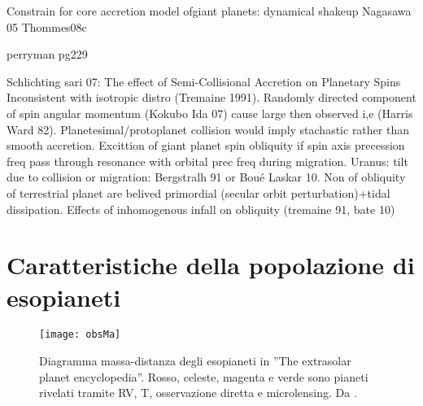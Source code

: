 \begin{workout}

\end{workout}

\begin{workout}
Constrain for core accretion model ofgiant planets: dynamical shakeup Nagasawa 05 Thommes08c
\end{workout}

\begin{workout}
perryman pg229
\end{workout}


\begin{workout}

\end{workout}

\begin{workout}
Schlichting sari 07: The effect of Semi-Collisional Accretion on Planetary Spins
Inconsistent with isotropic distro (Tremaine 1991). Randomly directed component of spin angular momentum (Kokubo Ida 07) cause large then observed i,e (Harris Ward 82).
Planetesimal/protoplanet collision would imply stachastic rather than smooth accretion.
Excittion of giant planet spin obliquity if spin axis precession freq pass through resonance with orbital prec freq during migration.
Uranus: tilt due to collision or migration: Bergstralh 91 or Bou\'e Laskar 10.
Non of obliquity of terrestrial planet are belived primordial (secular orbit perturbation)+tidal dissipation.
Effects of inhomogenous infall on obliquity (tremaine 91, bate 10)
\end{workout}


{\let\clearpage\relax\let\cleardoublepage\relax
\chapter{Caratteristiche della popolazione di esopianeti}
}

\begin{wrapfigure}[14]{l}{0.55\textwidth}
\texttt{[image: obsMa]}\label{fig:Maplot}
\caption{Diagramma massa-distanza degli esopianeti in ''The extrasolar planet encyclopedia''. Rosso, celeste, magenta e verde sono pianeti rivelati tramite RV, T, osservazione diretta e microlensing. Da \cite{mordasini2018}.}
\end{wrapfigure}

